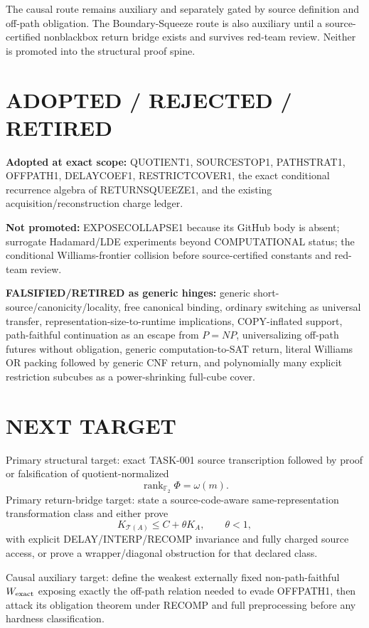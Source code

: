 \documentclass[11pt]{article}
\begin{document}
The causal route remains auxiliary and separately gated by source definition and off-path obligation. The Boundary-Squeeze route is also auxiliary until a source-certified nonblackbox return bridge exists and survives red-team review. Neither is promoted into the structural proof spine.

\section*{ADOPTED / REJECTED / RETIRED}
\textbf{Adopted at exact scope:} QUOTIENT1, SOURCESTOP1, PATHSTRAT1, OFFPATH1, DELAYCOEF1, RESTRICTCOVER1, the exact conditional recurrence algebra of RETURNSQUEEZE1, and the existing acquisition/reconstruction charge ledger.

\textbf{Not promoted:} EXPOSECOLLAPSE1 because its GitHub body is absent; surrogate Hadamard/LDE experiments beyond COMPUTATIONAL status; the conditional Williams-frontier collision before source-certified constants and red-team review.

\textbf{FALSIFIED/RETIRED as generic hinges:} generic short-source/canonicity/locality, free canonical binding, ordinary switching as universal transfer, representation-size-to-runtime implications, COPY-inflated support, path-faithful continuation as an escape from \(P=NP\), universalizing off-path futures without obligation, generic computation-to-SAT return, literal Williams OR packing followed by generic CNF return, and polynomially many explicit restriction subcubes as a power-shrinking full-cube cover.

\section*{NEXT TARGET}
Primary structural target: exact TASK-001 source transcription followed by proof or falsification of quotient-normalized
\[
\operatorname{rank}_{\mathbb F_2}\Phi=\omega(m).
\]
Primary return-bridge target: state a source-code-aware same-representation transformation class and either prove
\[
K_{\mathcal T(A)}\le C+\theta K_A,\qquad \theta<1,
\]
with explicit DELAY/INTERP/RECOMP invariance and fully charged source access, or prove a wrapper/diagonal obstruction for that declared class.

Causal auxiliary target: define the weakest externally fixed non-path-faithful \(W_{\rm exact}\) exposing exactly the off-path relation needed to evade OFFPATH1, then attack its obligation theorem under RECOMP and full preprocessing before any hardness classification.
\end{document}
